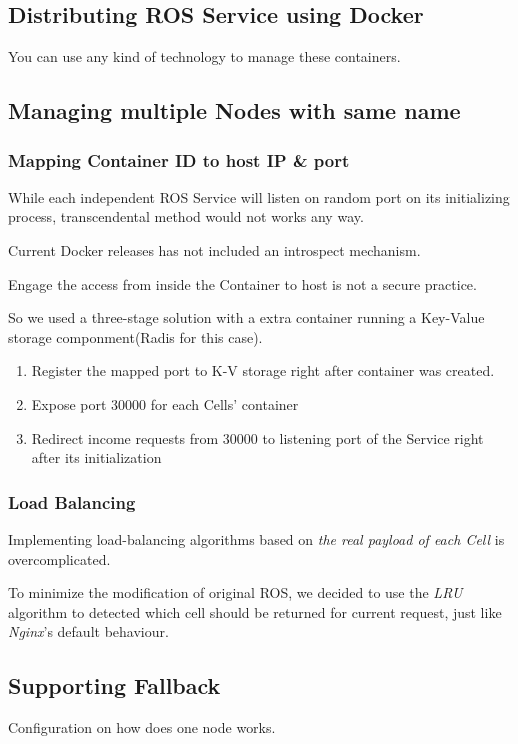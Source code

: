 \subsection{Distributing ROS Service using Docker}
You can use any kind of technology to manage these containers.

\subsection{Managing multiple Nodes with same name}
\subsubsection{Mapping Container ID to host IP \& port}
While each independent ROS Service will listen on random port on its initializing process,
transcendental method would not works any way. 

Current Docker releases has not included an introspect mechanism.

Engage the access from inside the Container to host is not a secure practice.

So we used a three-stage solution with a extra container running a Key-Value storage componment(Radis for this case).
\begin{enumerate}
    \item Register the mapped port to K-V storage right after container was created.
    \item Expose port 30000 for each Cells' container
    \item Redirect income requests from 30000 to listening port of the Service right after its initialization
\end{enumerate}

\subsubsection{Load Balancing}
Implementing load-balancing algorithms based on \emph{the real payload of each Cell} is overcomplicated.

To minimize the modification of original ROS, we decided to use the \emph{LRU} algorithm to detected which cell should be returned for current request, just like \emph{Nginx}'s default behaviour.

\subsection{Supporting Fallback}
Configuration on how does one node works. 

